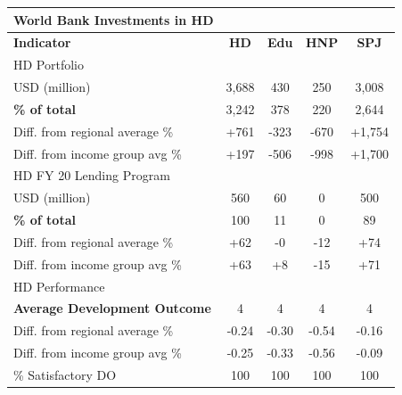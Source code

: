 \documentclass[9.2pt,twocolumn]{article}
\begin{document}
\begin{table}[H]
\small
\begin{tabular}{lcccc}
\textbf{World Bank Investments in HD} & \textbf{} & \textbf{} & \textbf{} & \textbf{} \\ \hline
\textbf{Indicator} & \textbf{HD} & \textbf{Edu} & \textbf{HNP} & \textbf{SPJ} \\ \hline
\cellcolor{iceberg}HD Portfolio & \cellcolor{iceberg} & \cellcolor{iceberg} & \cellcolor{iceberg} & \cellcolor{iceberg} \\ \hline
USD (million) & 3,688 & 430 & 250 & 3,008 \\ 
\textbf{\% of total} & \cellcolor{asparagus} 3,242 & \cellcolor{arylideyellow} 378 & \cellcolor{arylideyellow} 220 & \cellcolor{asparagus} 2,644 \\ 
Diff. from regional average \% & +761 & -323 & -670 & +1,754 \\ 
Diff. from income group avg \% & +197 & -506 & -998 & +1,700 \\ \hline
\cellcolor{iceberg}HD FY 20 Lending Program & \cellcolor{iceberg} & \cellcolor{iceberg} & \cellcolor{iceberg} & \cellcolor{iceberg} \\ \hline 
USD (million) & 560 & 60 & 0 & 500 \\ 
\textbf{\% of total} & \cellcolor{asparagus} 100 & \cellcolor{asparagus} 11 & \cellcolor{blush} 0 & \cellcolor{asparagus} 89 \\ 
Diff. from regional average \% & +62 & -0 & -12 & +74 \\ 
Diff. from income group avg \% & +63 & +8 & -15 & +71 \\ \hline
\cellcolor{iceberg}HD Performance & \cellcolor{iceberg} & \cellcolor{iceberg} & \cellcolor{iceberg} & \cellcolor{iceberg} \\ \hline
\textbf{Average Development Outcome} & \cellcolor{arylideyellow} 4 & \cellcolor{blush} 4 & \cellcolor{blush} 4 & \cellcolor{arylideyellow} 4 \\ 
Diff. from regional average \% & -0.24 & -0.30 & -0.54 & -0.16 \\ 
Diff. from income group avg \% & -0.25 & -0.33 & -0.56 & -0.09 \\ 
\% Satisfactory DO & 100 & 100 & 100 & 100 \\  \hline

\end{tabular}
\end{table}
\end{document}
